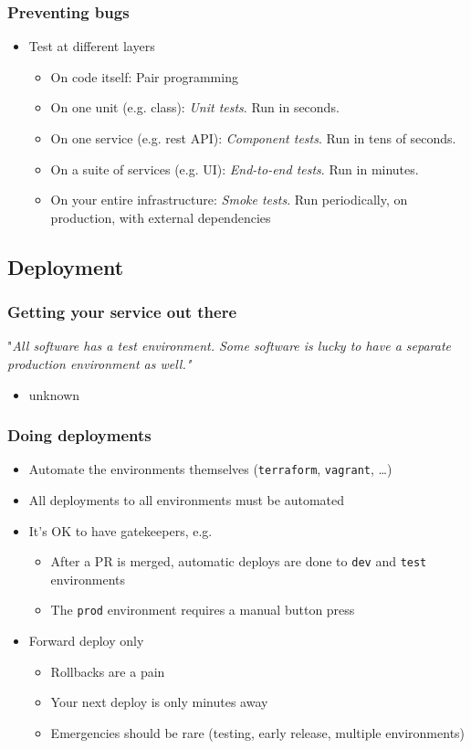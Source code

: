 \documentclass[8pt]{article}
\begin{document}
\subsubsection{Preventing bugs}
\label{sec:org4631405}
\begin{itemize}
\item Test at different layers
\begin{itemize}
\item On code itself: Pair programming
\item On one unit (e.g. class): \emph{Unit tests}. Run in seconds.
\item On one service (e.g. rest API): \emph{Component tests}. Run in tens of seconds.
\item On a suite of services (e.g. UI): \emph{End-to-end tests}. Run in minutes.
\item On your entire infrastructure: \emph{Smoke tests}. Run periodically, on production, with external dependencies
\end{itemize}
\end{itemize}
\subsection{Deployment}
\label{sec:orgbeb590d}
\subsubsection{Getting your service out there}
\label{sec:org788b7f0}
"\emph{All software has a test environment. Some software is lucky to have a separate production environment as well."}
\begin{itemize}
\item unknown
\end{itemize}
\subsubsection{Doing deployments}
\label{sec:orge06fab3}
\begin{itemize}
\item Automate the environments themselves (\texttt{terraform}, \texttt{vagrant}, \ldots{})
\item All deployments to all environments must be automated
\item It's OK to have gatekeepers, e.g.
\begin{itemize}
\item After a PR is merged, automatic deploys are done to \texttt{dev} and \texttt{test} environments
\item The \texttt{prod} environment requires a manual button press
\end{itemize}
\item Forward deploy only
\begin{itemize}
\item Rollbacks are a pain
\item Your next deploy is only minutes away
\item Emergencies should be rare (testing, early release, multiple environments)
\end{itemize}
\end{itemize}
\end{document}

